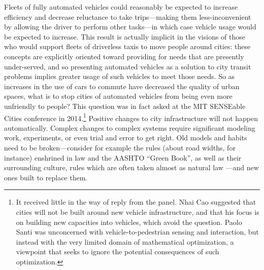 Fleets of fully automated vehicles could reasonably be expected to increase
efficiency and decrease reluctance to take trips---making them
less-inconvenient by allowing the driver to perform other tasks---in
which case vehicle usage would be expected to increase. This result is actually
implicit in the visions of those who would support fleets of
driverless taxis to move people around cities:  these concepts are
explicitly oriented toward providing for needs that are presently
under-served, and so presenting automated vehicles as a solution to
city transit problems implies greater usage of such vehicles to meet
those needs. So as increases in the use of cars to commute have
decreased the quality of urban spaces, what is to stop cities of
automated vehicles from
being even more unfriendly to
people? This question was in fact asked at the MIT SENSEable Cities
conference in 2014.\footnote{It received little in the way of reply from the
panel. Nhai Cao suggested that cities will not be built around new
vehicle infrastructure, and that his focus is on building new
capacities into vehicles, which avoid the question. Paolo Santi was
unconcerned with vehicle-to-pedestrian sensing and interaction, but
instead with the very limited domain of mathematical optimization,
a viewpoint that seeks to ignore the potential consequences of such
optimization.} Positive changes to city infrastructure will not happen
automatically. Complex
changes to complex systems require significant modeling work,
experiments, or even trial and error to get right. Old models and
habits need to be broken---consider for example the rules (about road
widths, for instance) enshrined in law and the AASHTO ``Green Book'', as well as their
surrounding culture, rules which are often taken almost as natural
law \cite[p. 181, 183]{swopeTrenton}---and new ones built to replace them. 

